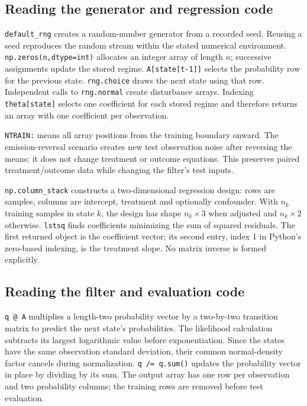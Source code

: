 \subsection{Reading the generator and regression code}
\texttt{default\_rng} creates a random-number generator from a recorded seed. Reusing a seed reproduces the random stream within the stated numerical environment. \texttt{np.zeros(n,dtype=int)} allocates an integer array of length $n$; successive assignments update the stored regime. \texttt{A[state[t-1]]} selects the probability row for the previous state. \texttt{rng.choice} draws the next state using that row. Independent calls to \texttt{rng.normal} create disturbance arrays. Indexing \texttt{theta[state]} selects one coefficient for each stored regime and therefore returns an array with one coefficient per observation.

\texttt{NTRAIN:} means all array positions from the training boundary onward. The emission-reversal scenario creates new test observation noise after reversing the means; it does not change treatment or outcome equations. This preserves paired treatment/outcome data while changing the filter's test inputs.

\texttt{np.column\_stack} constructs a two-dimensional regression design: rows are samples, columns are intercept, treatment and optionally confounder. With $n_k$ training samples in state $k$, the design has shape $n_k\times3$ when adjusted and $n_k\times2$ otherwise. \texttt{lstsq} finds coefficients minimizing the sum of squared residuals. The first returned object is the coefficient vector; its second entry, index 1 in Python's zero-based indexing, is the treatment slope. No matrix inverse is formed explicitly.

\subsection{Reading the filter and evaluation code}
\texttt{q @ A} multiplies a length-two probability vector by a two-by-two transition matrix to predict the next state's probabilities. The likelihood calculation subtracts its largest logarithmic value before exponentiation. Since the states have the same observation standard deviation, their common normal-density factor cancels during normalization. \texttt{q /= q.sum()} updates the probability vector in place by dividing by its sum. The output array has one row per observation and two probability columns; the training rows are removed before test evaluation.

